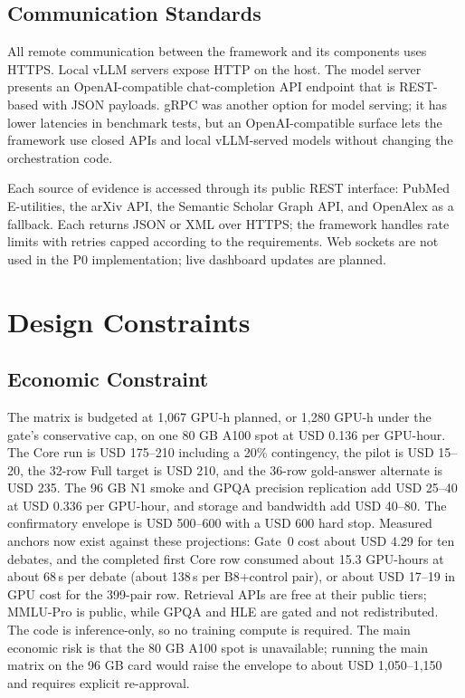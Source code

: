 \subsection{Communication Standards}

All remote communication between the framework and its components uses HTTPS. Local vLLM servers expose HTTP on the host. The model server presents an OpenAI-compatible chat-completion API endpoint that is REST-based with JSON payloads. gRPC was another option for model serving; it has lower latencies in benchmark tests, but an OpenAI-compatible surface lets the framework use closed APIs and local vLLM-served models without changing the orchestration code.

Each source of evidence is accessed through its public REST interface: PubMed E-utilities, the arXiv API, the Semantic Scholar Graph API, and OpenAlex as a fallback. Each returns JSON or XML over HTTPS; the framework handles rate limits with retries capped according to the requirements. Web sockets are not used in the P0 implementation; live dashboard updates are planned.

\section{Design Constraints}

\subsection{Economic Constraint}

The matrix is budgeted at 1,067 GPU-h planned, or 1,280 GPU-h under the gate's conservative cap, on one 80 GB A100 spot at USD 0.136 per GPU-hour. The Core run is USD 175--210 including a 20\% contingency, the pilot is USD 15--20, the 32-row Full target is USD 210, and the 36-row gold-answer alternate is USD 235. The 96 GB N1 smoke and GPQA precision replication add USD 25--40 at USD 0.336 per GPU-hour, and storage and bandwidth add USD 40--80. The confirmatory envelope is USD 500--600 with a USD 600 hard stop. Measured anchors now exist against these projections: Gate~0 cost about USD 4.29 for ten debates, and the completed first Core row consumed about 15.3 GPU-hours at about 68\,s per debate (about 138\,s per B8+control pair), or about USD 17--19 in GPU cost for the 399-pair row. Retrieval APIs are free at their public tiers; MMLU-Pro is public, while GPQA and HLE are gated and not redistributed. The code is inference-only, so no training compute is required. The main economic risk is that the 80 GB A100 spot is unavailable; running the main matrix on the 96 GB card would raise the envelope to about USD 1,050--1,150 and requires explicit re-approval.

